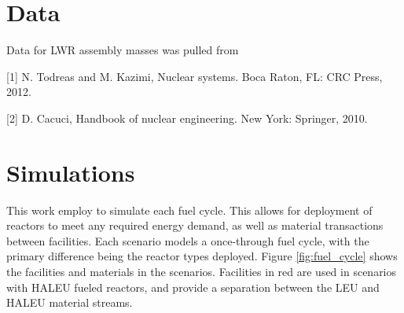 \section{Data}
Data for LWR assembly masses was pulled from 

[1] N. Todreas and M. Kazimi, 
Nuclear systems. Boca Raton, FL: CRC Press, 2012.

[2] D. Cacuci, Handbook of nuclear engineering. New York: Springer, 2010.

\section{Simulations}
This work employ \Cyclus \cite{huff_fundamental_2016} to simulate each fuel 
cycle. This allows for deployment of reactors to meet any required energy 
demand, as well as material transactions between facilities. Each scenario
models a once-through fuel cycle, with the primary difference being the 
reactor types deployed. Figure \ref{fig:fuel_cycle} shows the facilities 
and materials in the scenarios. Facilities in red are used in scenarios 
with \gls{HALEU} fueled reactors, and provide a separation between the 
\gls{LEU} and \gls{HALEU} material streams. 

